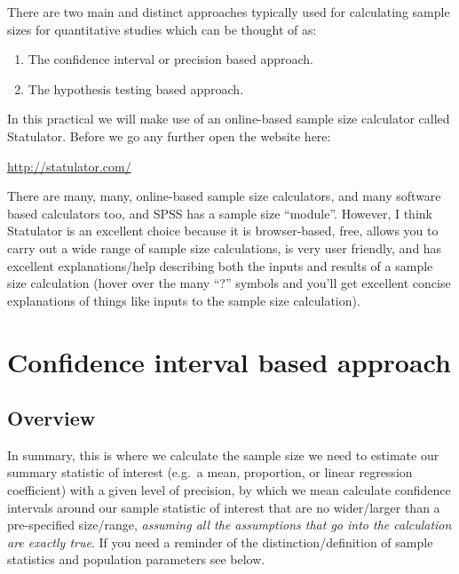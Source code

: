 \documentclass[
]{book}
\begin{document}
There are two main and distinct approaches typically used for calculating sample sizes for quantitative studies which can be thought of as:

\begin{enumerate}
\def\labelenumi{\arabic{enumi}.}
\item
  The confidence interval or precision based approach.
\item
  The hypothesis testing based approach.
\end{enumerate}

In this practical we will make use of an online-based sample size calculator called Statulator. Before we go any further open the website here:

\url{http://statulator.com/}

There are many, many, online-based sample size calculators, and many software based calculators too, and SPSS has a sample size ``module''. However, I think Statulator is an excellent choice because it is browser-based, free, allows you to carry out a wide range of sample size calculations, is very user friendly, and has excellent explanations/help describing both the inputs and results of a sample size calculation (hover over the many ``?'' symbols and you'll get excellent concise explanations of things like inputs to the sample size calculation).

\hypertarget{confidence-interval-based-approach}{%
\section{Confidence interval based approach}\label{confidence-interval-based-approach}}

\hypertarget{overview-5}{%
\subsection{Overview}\label{overview-5}}

In summary, this is where we calculate the sample size we need to estimate our summary statistic of interest (e.g.~a mean, proportion, or linear regression coefficient) with a given level of precision, by which we mean calculate confidence intervals around our sample statistic of interest that are no wider/larger than a pre-specified size/range, \emph{assuming all the assumptions that go into the calculation are exactly true}. If you need a reminder of the distinction/definition of sample statistics and population parameters see below.
\end{document}
